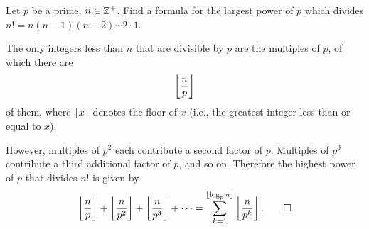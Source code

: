  Let $p$ be a prime, $n\in\mathbb{Z}^+$. Find a formula for the
largest power of $p$ which divides $n! = n(n-1)(n-2)\cdots2\cdot1$.
\begin{solution}
  The only integers less than $n$ that are divisible by $p$ are the
  multiples of $p$, of which there are
  \begin{equation*}
    \left\lfloor{\frac{n}{p}}\right\rfloor
  \end{equation*}
  of them, where $\lfloor{x}\rfloor$ denotes the floor of $x$ (i.e., the
  greatest integer less than or equal to $x$).

  However, multiples of $p^2$ each contribute a second factor of
  $p$. Multiples of $p^3$ contribute a third additional factor of $p$,
  and so on. Therefore the highest power of $p$ that divides $n!$ is
  given by
  \begin{equation*}
    \left\lfloor{\frac{n}{p}}\right\rfloor + \left\lfloor{\frac{n}{p^2}}\right\rfloor + \left\lfloor{\frac{n}{p^3}}\right\rfloor
    + \cdots
    = \sum_{k=1}^{\lfloor{\log_pn}\rfloor}\left\lfloor{\frac{n}{p^k}}\right\rfloor.\qedhere
  \end{equation*}
\end{solution}

